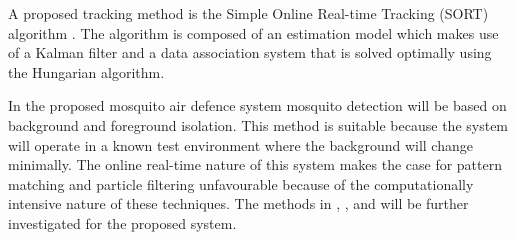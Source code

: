 A proposed tracking method is the Simple Online Real-time Tracking (SORT) algorithm \cite{SORT-Bewley2017}. The algorithm is composed of an estimation model which makes use of a Kalman filter and a data association system that is solved optimally using the Hungarian algorithm.

In the proposed mosquito air defence system mosquito detection will be based on background and foreground isolation. This method is suitable because the system will operate in a known test environment where the background will change minimally. The online real-time nature of this system makes the case for pattern matching and particle filtering unfavourable because of the computationally intensive nature of these techniques. The methods in \cite{Liang2016}, \cite{Bao2018}, and \cite{SORT-Bewley2017} will be further investigated for the proposed system.


\newpage



